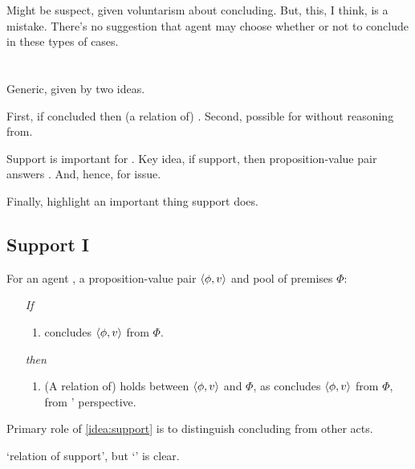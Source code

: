 \begin{note}
  Might be suspect, given voluntarism about concluding.
  But, this, I think, is a mistake.
  There's no suggestion that agent may choose whether or not to conclude in these types of cases.
\end{note}


\section{}
\label{cha:clarification:support}

\begin{note}
  \color{red}
  Generic, given by two ideas.

  First, if concluded then (a relation of) \support{}.
  Second, possible for \support{} without reasoning from.

  Support is important for \qWhy{}.
  Key idea, if support, then proposition-value pair answers \qWhy{}.
  And, hence, for issue.

  Finally, highlight an important thing support does.
\end{note}


\subsection{Support I}

\begin{note}
  \begin{idea}[Support I]
    \label{idea:support}
    For an agent \vAgent{}, a proposition-value pair \(\langle \phi, v \rangle\) and pool of premises \(\Phi\):

    \begin{itemize}
    \item[\emph{If}]
      \begin{enumerate}[label=\alph*., ref=(\alph*)]
      \item
        \vAgent{} concludes \(\langle \phi, v \rangle\) from \(\Phi\).
      \end{enumerate}
      \item[\emph{then}]
        \begin{enumerate}[label=\alph*., ref=(\alph*), resume]
        \item
          (A relation of) \emph{\support{}} holds between \(\langle \phi, v \rangle\) and \(\Phi\), as \vAgent{} concludes \(\langle \phi, v \rangle\) from \(\Phi\), from \vAgent{}' perspective.
        \end{enumerate}
      \end{itemize}
      \vspace{-\baselineskip}
  \end{idea}

  Primary role of \autoref{idea:support} is to distinguish concluding from other acts.

  `relation of support', but `\support{}' is clear.
\end{note}

